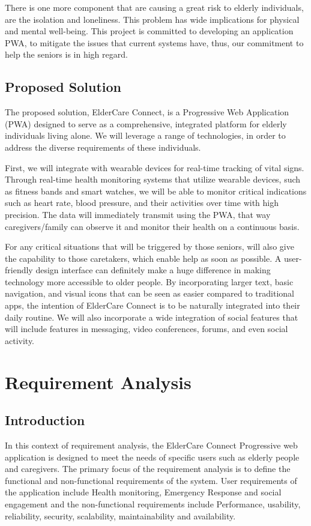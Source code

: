\documentclass[a4paper, 12pt]{article}
\begin{document}
There is one more component that are causing a great risk to elderly individuals, are the isolation and loneliness. This problem has wide implications for physical and mental well-being.
This project is committed to developing an application PWA, to mitigate the issues that current systems have, thus, our commitment to help the seniors is in high regard.

\subsection{ Proposed Solution}
The proposed solution, ElderCare Connect, is a Progressive Web Application (PWA) designed to serve as a comprehensive, integrated platform for elderly individuals living alone. We will leverage a range of technologies, in order to address the diverse requirements of these individuals.

First, we will integrate with wearable devices for real-time tracking of vital signs. Through real-time health monitoring systems that utilize wearable devices, such as fitness bands and smart watches, we will be able to monitor critical indications such as heart rate, blood pressure, and their activities over time with high precision. The data will immediately transmit using the PWA, that way caregivers/family can observe it and monitor their health on a continuous basis.

For any critical situations that will be triggered by those seniors, will also give the capability to those caretakers, which enable help as soon as possible. A user-friendly design interface can definitely make a huge difference in making technology more accessible to older people. By incorporating larger text, basic navigation, and visual icons that can be seen as easier compared to traditional apps, the intention of ElderCare Connect is to be naturally integrated into their daily routine. We will also incorporate a wide integration of social features that will include features in messaging, video conferences, forums, and even social activity.

\newpage

\section{\textbf{\LARGE Requirement Analysis}}
\subsection{Introduction}
In this context of requirement analysis, the ElderCare Connect Progressive web application is designed to meet the needs of specific users such as elderly people and caregivers. The primary focus of the requirement analysis is to define the functional and non-functional requirements of the system. User requirements of the application include Health monitoring, Emergency Response and social engagement and  the non-functional requirements include Performance, usability, reliability, security, scalability, maintainability and availability.
\end{document}
